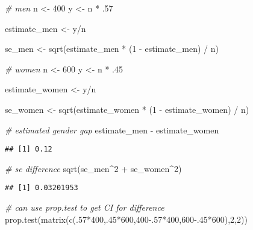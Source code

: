 \documentclass[
]{article}
\newenvironment{Shaded}{\begin{snugshade}}{\end{snugshade}}
\newcommand{\CommentTok}[1]{\textcolor[rgb]{0.56,0.35,0.01}{\textit{#1}}}
\newcommand{\DecValTok}[1]{\textcolor[rgb]{0.00,0.00,0.81}{#1}}
\newcommand{\FloatTok}[1]{\textcolor[rgb]{0.00,0.00,0.81}{#1}}
\newcommand{\FunctionTok}[1]{\textcolor[rgb]{0.00,0.00,0.00}{#1}}
\newcommand{\NormalTok}[1]{#1}
\newcommand{\OtherTok}[1]{\textcolor[rgb]{0.56,0.35,0.01}{#1}}
\newcommand{\SpecialCharTok}[1]{\textcolor[rgb]{0.00,0.00,0.00}{#1}}
\begin{document}
\begin{Shaded}
\begin{Highlighting}[]
\CommentTok{\# men}
\NormalTok{n }\OtherTok{\textless{}{-}} \DecValTok{400}
\NormalTok{y }\OtherTok{\textless{}{-}}\NormalTok{ n }\SpecialCharTok{*}\NormalTok{ .}\DecValTok{57}

\NormalTok{estimate\_men }\OtherTok{\textless{}{-}}\NormalTok{ y}\SpecialCharTok{/}\NormalTok{n}

\NormalTok{se\_men }\OtherTok{\textless{}{-}} \FunctionTok{sqrt}\NormalTok{(estimate\_men }\SpecialCharTok{*}\NormalTok{ (}\DecValTok{1} \SpecialCharTok{{-}}\NormalTok{ estimate\_men) }\SpecialCharTok{/}\NormalTok{ n)}

\CommentTok{\# women}
\NormalTok{n }\OtherTok{\textless{}{-}} \DecValTok{600}
\NormalTok{y }\OtherTok{\textless{}{-}}\NormalTok{ n }\SpecialCharTok{*}\NormalTok{ .}\DecValTok{45}

\NormalTok{estimate\_women }\OtherTok{\textless{}{-}}\NormalTok{ y}\SpecialCharTok{/}\NormalTok{n}

\NormalTok{se\_women }\OtherTok{\textless{}{-}} \FunctionTok{sqrt}\NormalTok{(estimate\_women }\SpecialCharTok{*}\NormalTok{ (}\DecValTok{1} \SpecialCharTok{{-}}\NormalTok{ estimate\_women) }\SpecialCharTok{/}\NormalTok{ n)}

\CommentTok{\# estimated gender gap}
\NormalTok{estimate\_men }\SpecialCharTok{{-}}\NormalTok{ estimate\_women}
\end{Highlighting}
\end{Shaded}

\begin{verbatim}
## [1] 0.12
\end{verbatim}

\begin{Shaded}
\begin{Highlighting}[]
\CommentTok{\# se difference}
\FunctionTok{sqrt}\NormalTok{(se\_men}\SpecialCharTok{\^{}}\DecValTok{2} \SpecialCharTok{+}\NormalTok{ se\_women}\SpecialCharTok{\^{}}\DecValTok{2}\NormalTok{)}
\end{Highlighting}
\end{Shaded}

\begin{verbatim}
## [1] 0.03201953
\end{verbatim}

\begin{Shaded}
\begin{Highlighting}[]
\CommentTok{\# can use prop.test to get CI for difference}
\FunctionTok{prop.test}\NormalTok{(}\FunctionTok{matrix}\NormalTok{(}\FunctionTok{c}\NormalTok{(.}\DecValTok{57}\SpecialCharTok{*}\DecValTok{400}\NormalTok{,.}\DecValTok{45}\SpecialCharTok{*}\DecValTok{600}\NormalTok{,}\DecValTok{400}\FloatTok{{-}.57}\SpecialCharTok{*}\DecValTok{400}\NormalTok{,}\DecValTok{600}\FloatTok{{-}.45}\SpecialCharTok{*}\DecValTok{600}\NormalTok{),}\DecValTok{2}\NormalTok{,}\DecValTok{2}\NormalTok{))}
\end{Highlighting}
\end{Shaded}
\end{document}
